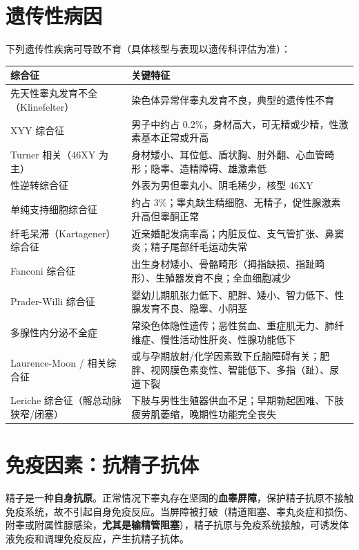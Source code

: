 \documentclass[12pt,UTF8,openany]{ctexbook}
\begin{document}
\section{遗传性病因}

下列遗传性疾病可导致不育（具体核型与表现以遗传科评估为准）：

\begin{center}
\renewcommand{\arraystretch}{1.3}
\small
\begin{tabularx}{\textwidth}{|X|X|}
\hline
\textbf{综合征} & \textbf{关键特征} \\
\hline
先天性睾丸发育不全（Klinefelter） & 染色体异常伴睾丸发育不良，典型的遗传性不育 \\
\hline
XYY 综合征 & 男子中约占 0.2\%，身材高大，可无精或少精，性激素基本正常或升高 \\
\hline
Turner 相关（46XY 为主） & 身材矮小、耳位低、盾状胸、肘外翻、心血管畸形；隐睾、造精障碍、雄激素低 \\
\hline
性逆转综合征 & 外表为男但睾丸小、阴毛稀少，核型 46XY \\
\hline
单纯支持细胞综合征 & 约占 3\%；睾丸缺生精细胞、无精子，促性腺激素升高但睾酮正常 \\
\hline
纤毛呆滞（Kartagener）综合征 & 近亲婚配发病率高；内脏反位、支气管扩张、鼻窦炎；精子尾部纤毛运动失常 \\
\hline
Fanconi 综合征 & 出生身材矮小、骨骼畸形（拇指缺损、指趾畸形）、生殖器发育不良；全血细胞减少 \\
\hline
Prader-Willi 综合征 & 婴幼儿期肌张力低下、肥胖、矮小、智力低下、性腺发育不良、隐睾、小阴茎 \\
\hline
多腺性内分泌不全症 & 常染色体隐性遗传；恶性贫血、重症肌无力、肺纤维症、慢性活动性肝炎、性腺功能低下 \\
\hline
Laurence-Moon / 相关综合征 & 或与孕期放射/化学因素致下丘脑障碍有关；肥胖、视网膜色素变性、智能低下、多指（趾）、尿道下裂 \\
\hline
Leriche 综合征（髂总动脉狭窄/闭塞） & 下肢与男性生殖器供血不足；早期勃起困难、下肢疲劳肌萎缩，晚期性功能完全丧失 \\
\hline
\end{tabularx}
\end{center}

\section{免疫因素：抗精子抗体}

精子是一种\textbf{自身抗原}。正常情况下睾丸存在坚固的\textbf{血睾屏障}，保护精子抗原不接触免疫系统，故不引起自身免疫反应。当屏障被打破（精道阻塞、睾丸炎症和损伤、附睾或附属性腺感染，\textbf{尤其是输精管阻塞}），精子抗原与免疫系统接触，可诱发体液免疫和调理免疫反应，产生抗精子抗体。
\end{document}
